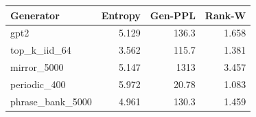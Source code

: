\begin{tabular}{lrrr}
\toprule
Generator & Entropy & Gen-PPL & Rank-W \\
\midrule
gpt2 & 5.129 & 136.3 & 1.658 \\
top\_k\_iid\_64 & 3.562 & 115.7 & 1.381 \\
mirror\_5000 & 5.147 & 1313 & 3.457 \\
periodic\_400 & 5.972 & 20.78 & 1.083 \\
phrase\_bank\_5000 & 4.961 & 130.3 & 1.459 \\
\bottomrule
\end{tabular}
